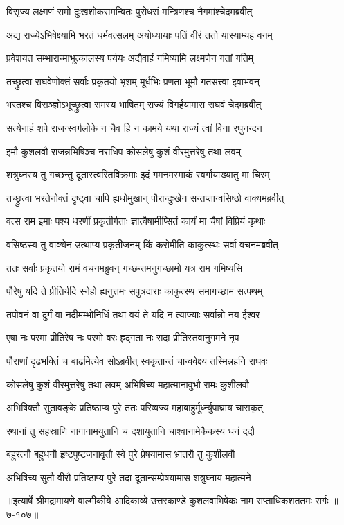 
\twolineshloka
{विसृज्य लक्ष्मणं रामो दुःखशोकसमन्वितः}
{पुरोधसं मन्त्रिणश्च नैगमांश्चेदमब्रवीत्} %

\twolineshloka
{अद्य राज्येऽभिषेक्ष्यामि भरतं धर्मवत्सलम्}
{अयोध्यायाः पतिं वीरं ततो यास्याम्यहं वनम्} %

\twolineshloka
{प्रवेशयत सम्भारान्माभूत्कालस्य पर्ययः}
{अद्यैवाहं गमिष्यामि लक्ष्मणेन गतां गतिम्} %

\twolineshloka
{तच्छ्रुत्वा राघवेणोक्तं सर्वाः प्रकृतयो भृशम्}
{मूर्धभिः प्रणता भूमौ गतसत्त्वा इवाभवन्} %

\twolineshloka
{भरतश्च विसञ्ज्ञोऽभूच्छ्रुत्वा रामस्य भाषितम्}
{राज्यं विगर्हयामास राघवं चेदमब्रवीत्} %

\twolineshloka
{सत्येनाहं शपे राजन्स्वर्गलोके न चैव हि}
{न कामये यथा राज्यं त्वां विना रघुनन्दन} %

\twolineshloka
{इमौ कुशलवौ राजन्नभिषिञ्च नराधिप}
{कोसलेषु कुशं वीरमुत्तरेषु तथा लवम्} %

\twolineshloka
{शत्रुघ्नस्य तु गच्छन्तु दूतास्त्वरितविक्रमाः}
{इदं गमनमस्माकं स्वर्गायाख्यातु मा चिरम्} %

\twolineshloka
{तच्छ्रुत्वा भरतेनोक्तं दृष्ट्वा चापि ह्यधोमुखान्}
{पौरान्दुःखेन सन्तप्तान्वसिष्ठो वाक्यमब्रवीत्} %

\twolineshloka
{वत्स राम इमाः पश्य धरणीं प्रकृतीर्गताः}
{ज्ञात्वैषामीप्सितं कार्यं मा चैषां विप्रियं कृथाः} %

\twolineshloka
{वसिष्ठस्य तु वाक्येन उत्थाप्य प्रकृतीजनम्}
{किं करोमीति काकुत्स्थः सर्वा वचनमब्रवीत्} %

\twolineshloka
{ततः सर्वाः प्रकृतयो रामं वचनमब्रुवन्}
{गच्छन्तमनुगच्छामो यत्र राम गमिष्यसि} %

\twolineshloka
{पौरेषु यदि ते प्रीतिर्यदि स्नेहो ह्यनुत्तमः}
{सपुत्रदाराः काकुत्स्थ समागच्छाम सत्पथम्} %

\twolineshloka
{तपोवनं वा दुर्गं वा नदीमम्भोनिधिं तथा}
{वयं ते यदि न त्याज्याः सर्वान्नो नय ईश्वर} %

\twolineshloka
{एषा नः परमा प्रीतिरेष नः परमो वरः}
{हृद्गता नः सदा प्रीतिस्तवानुगमने नृप} %

\twolineshloka
{पौराणां दृढभक्तिं च बाढमित्येव सोऽब्रवीत्}
{स्वकृतान्तं चान्ववेक्ष्य तस्मिन्नहनि राघवः} %

\twolineshloka
{कोसलेषु कुशं वीरमुत्तरेषु तथा लवम्}
{अभिषिच्य महात्मानावुभौ रामः कुशीलवौ} %

\twolineshloka
{अभिषिक्तौ सुतावङ्के प्रतिष्ठाप्य पुरे ततः}
{परिष्वज्य महाबाहुर्मूर्ध्न्युपाघ्राय चासकृत्} %

\twolineshloka
{रथानां तु सहस्राणि नागानामयुतानि च}
{दशायुतानि चाश्वानामेकैकस्य धनं ददौ} %

\twolineshloka
{बहुरत्नौ बहुधनौ हृष्टपुष्टजनावृतौ}
{स्वे पुरे प्रेषयामास भ्रातरौ तु कुशीलवौ} %

\twolineshloka
{अभिषिच्य सुतौ वीरौ प्रतिष्ठाप्य पुरे तदा}
{दूतान्सम्प्रेषयामास शत्रुघ्नाय महात्मने} %


॥इत्यार्षे श्रीमद्रामायणे वाल्मीकीये आदिकाव्ये उत्तरकाण्डे कुशलवाभिषेकः नाम सप्ताधिकशततमः सर्गः ॥७-१०७॥
